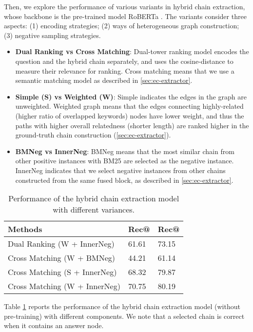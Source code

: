 \documentclass[11pt]{article}
\begin{document}
Then, we explore the performance of various variants in hybrid chain extraction, whose backbone is the pre-trained model RoBERTa \cite{Liu2019RoBERTaAR}.
The variants consider three aspects: (1) encoding strategies; (2) ways of heterogeneous graph construction; (3) negative sampling strategies.
	\begin{itemize}
		\item[(1)] \textbf{Dual Ranking vs Cross Matching}: Dual-tower ranking model \cite{karpukhin2020dense} encodes the question and the hybrid chain separately, and uses the cosine-distance to measure their relevance for ranking. Cross matching means that we use a semantic matching model as described in \cref{sec:ec-extractor}.
\item[(2)] \textbf{Simple (S) vs Weighted (W)}: Simple indicates the edges in the graph are unweighted. Weighted graph means that the edges connecting highly-related (higher ratio of overlapped keywords) nodes have lower weight, and thus the paths with higher overall relatedness (shorter length) are ranked higher in the ground-truth chain construction (\cref{sec:ec-extractor}). 
		\item[(3)] \textbf{BMNeg vs InnerNeg}: BMNeg means that the most similar chain from other positive instances with BM25 are selected as the negative instance.
		InnerNeg indicates that we select negative instances from other chains constructed from the same fused block, as described in \cref{sec:ec-extractor}.
	\end{itemize}
	\begin{table}[h]
	\small
		\centering
		\begin{tabular}{lll}
			\hline
			Methods                               & Rec@ & Rec@ \\ \hline
			Dual Ranking (W + InnerNeg)  & 61.61      &  73.15          \\
			Cross Matching (W + BMNeg)    & 44.21      & 61.14      \\
			Cross Matching (S + InnerNeg)   & 68.32      & 79.87      \\
			Cross Matching (W + InnerNeg) & 70.75      & 80.19      \\ \hline
		\end{tabular}
		\caption{Performance of the hybrid chain extraction model with different variances.}
\label{tab:ec-extraction}
	\end{table}
	Table \ref{tab:ec-extraction} reports the performance of the hybrid chain extraction model (without pre-training) with different components. 
	We note that a selected chain is correct when it contains an answer node. 
\end{document}

